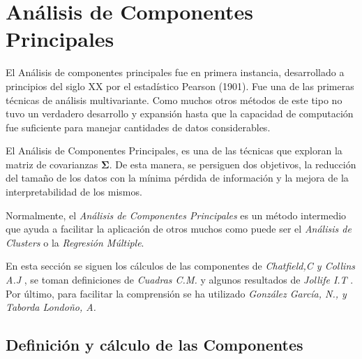 \newpage
\section{Análisis de Componentes Principales}

\noindent El Análisis de componentes principales fue en primera instancia, desarrollado a principios del siglo XX por el estadístico Pearson (1901). Fue una de las primeras técnicas de análisis multivariante. Como muchos otros métodos de este tipo no tuvo un verdadero desarrollo y expansión hasta que la capacidad de computación fue suficiente para manejar cantidades de datos considerables. 

\noindent El Análisis de Componentes Principales, es una de las técnicas que exploran la matriz de covarianzas $\mathbf{\Sigma}$. De esta manera, se persiguen dos objetivos, la reducción del tamaño de los datos con la mínima pérdida de información y la mejora de la interpretabilidad de los mismos. 

\noindent Normalmente, el \emph{Análisis de Componentes Principales} es un método intermedio que ayuda a facilitar la aplicación de otros muchos como puede ser el \emph{Análisis de Clusters} o la \emph{Regresión Múltiple}. 

\noindent En esta sección se siguen los  cálculos de las componentes de \emph{Chatfield,C y Collins A.J} \cite{Chatfield 1989}, se toman definiciones de \emph{Cuadras C.M.}\cite{Cuadras 2014} y  algunos resultados de \emph{Jollife I.T}  \cite{Jollife 1986}. Por último, para facilitar la comprensión se ha utilizado \emph{González García, N., y  Taborda Londoño, A.}\cite{González 2015} 

\subsection{Definición y cálculo de las Componentes}

